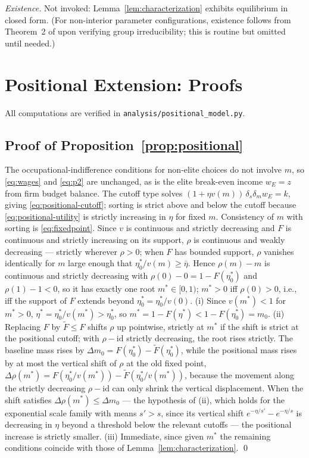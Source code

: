 \documentclass[12pt,letterpaper]{article}
\theoremstyle{definition}
\begin{document}
\emph{Existence.}
Not invoked: Lemma~\ref{lem:characterization} exhibits equilibrium in closed form.
(For non-interior parameter configurations, existence follows from Theorem~2 of \citealt{ellickson2006organization} upon verifying group irreducibility; this is routine but omitted until needed.)

\section{Positional Extension: Proofs}\label{app:positional}

All computations are verified in \texttt{analysis/positional\_model.py}.

\subsection{Proof of Proposition~\ref{prop:positional}} The occupational-indifference conditions for non-elite choices do not involve $m$, so \eqref{eq:wages} and \eqref{eq:p2} are unchanged, as is the elite break-even income $w_E=z$ from firm budget balance.
The cutoff type solves $(1+\eta v(m))\,\delta_s\delta_m w_E = k$, giving \eqref{eq:positional-cutoff}; sorting is strict above and below the cutoff because \eqref{eq:positional-utility} is strictly increasing in $\eta$ for fixed $m$.
Consistency of $m$ with sorting is \eqref{eq:fixedpoint}.
Since $v$ is continuous and strictly decreasing and $F$ is continuous and strictly increasing on its support, $\rho$ is continuous and weakly decreasing --- strictly wherever $\rho>0$; when $F$ has bounded support, $\rho$ vanishes identically for $m$ large enough that $\eta^\ast_0/v(m)\geq\bar\eta$.
Hence $\rho(m)-m$ is continuous and strictly decreasing with $\rho(0)-0=1-F(\eta^\ast_0)$ and $\rho(1)-1<0$, so it has exactly one root $m^\ast\in[0,1)$; $m^\ast>0$ iff $\rho(0)>0$, i.e., iff the support of $F$ extends beyond $\eta^\ast_0=\eta^\ast_0/v(0)$.
(i) Since $v(m^\ast)<1$ for $m^\ast>0$, $\eta^\ast=\eta^\ast_0/v(m^\ast)>\eta^\ast_0$, so $m^\ast=1-F(\eta^\ast)<1-F(\eta^\ast_0)=m_0$.
(ii) Replacing $F$ by $\tilde F\leq F$ shifts $\rho$ up pointwise, strictly at $m^\ast$ if the shift is strict at the positional cutoff; with $\rho-\mathrm{id}$ strictly decreasing, the root rises strictly.
The baseline mass rises by $\Delta m_0 = F(\eta^\ast_0)-\tilde F(\eta^\ast_0)$, while the positional mass rises by at most the vertical shift of $\rho$ at the old fixed point, $\Delta\rho(m^\ast) = F(\eta^\ast_0/v(m^\ast))-\tilde F(\eta^\ast_0/v(m^\ast))$, because the movement along the strictly decreasing $\rho-\mathrm{id}$ can only shrink the vertical displacement.
When the shift satisfies $\Delta\rho(m^\ast)\leq\Delta m_0$ --- the hypothesis of (ii), which holds for the exponential scale family with means $s'>s$, since its vertical shift $e^{-\eta/s'}-e^{-\eta/s}$ is decreasing in $\eta$ beyond a threshold below the relevant cutoffs --- the positional increase is strictly smaller.
(iii) Immediate, since given $m^\ast$ the remaining conditions coincide with those of Lemma~\ref{lem:characterization}.
\qed
\end{document}
